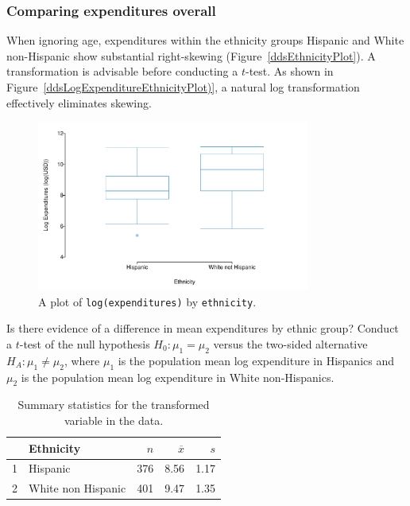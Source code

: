 \subsubsection{Comparing expenditures overall}

When ignoring age, expenditures within the ethnicity groups Hispanic and White non-Hispanic show substantial right-skewing (Figure~\ref{ddsEthnicityPlot}). A transformation is advisable before conducting a $t$-test. As shown in Figure~\ref{ddsLogExpenditureEthnicityPlot)}, a natural log transformation effectively eliminates skewing. 

\begin{figure}[h]
	\centering
	\includegraphics[width=0.8\textwidth]{ch_inference_for_means_oi_biostat/figures/ddsLogExpEthnicityPlot/ddsLogExpEthnicityPlot.pdf}
	\caption{A plot of \texttt{log(expenditures)} by \texttt{ethnicity}.}
	\label{ddsLogExpEthnicityPlot}
\end{figure} 

Is there evidence of a difference in mean expenditures by ethnic group? Conduct a $t$-test of the null hypothesis $H_0: \mu_1 = \mu_2$ versus the two-sided alternative $H_A: \mu_1 \neq \mu_2$, where $\mu_1$ is the population mean log expenditure in Hispanics and $\mu_2$ is the population mean log expenditure in White non-Hispanics.



\begin{table}[ht]
\centering
\begin{tabular}{rlrrr} \hline
 & Ethnicity & $n$ & $\overline{x}$ & $s$ \\  \hline
1 & Hispanic & 376 & 8.56 & 1.17 \\ 
2 & White non Hispanic & 401 & 9.47 & 1.35 \\  \hline
\end{tabular}
\caption{Summary statistics for the transformed variable  in the  data.} 
\label{ddsLogExpenditureSummaryByEthnicity}
\end{table}

